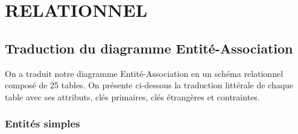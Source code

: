 \section{RELATIONNEL}

\subsection{Traduction du diagramme Entité-Association}

On a traduit notre diagramme Entité-Association en un schéma relationnel composé de 25 tables. On présente ci-dessous la traduction littérale de chaque table avec ses attributs, clés primaires, clés étrangères et contraintes.

\subsubsection{Entités simples}

